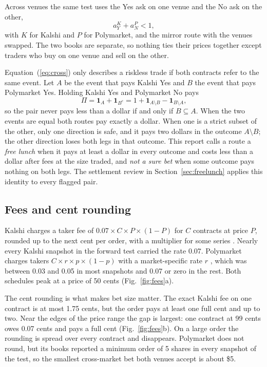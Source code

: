\documentclass[5p,letterpaper]{elsarticle}
\newcommand{\ind}{\mathbf{1}}
\begin{document}
Across venues the same test uses the Yes ask on one venue and the No ask on the other,
\begin{equation}\label{eq:cross}
a_Y^K + a_N^P < 1 ,
\end{equation}
with $K$ for Kalshi and $P$ for Polymarket, and the mirror route with the venues swapped. The two books are separate, so nothing ties their prices together except traders who buy on one venue and sell on the other.

Equation~(\ref{eq:cross}) only describes a riskless trade if both contracts refer to the same event. Let $A$ be the event that pays Kalshi Yes and $B$ the event that pays Polymarket Yes. Holding Kalshi Yes and Polymarket No pays
\begin{equation}\label{eq:payoff}
\Pi = \ind_A + \ind_{B^c} = 1 + \ind_{A\setminus B} - \ind_{B\setminus A},
\end{equation}
so the pair never pays less than a dollar if and only if $B \subseteq A$. When the two events are equal both routes pay exactly a dollar. When one is a strict subset of the other, only one direction is safe, and it pays two dollars in the outcome $A \setminus B$; the other direction loses both legs in that outcome. This report calls a route a \emph{free lunch} when it pays at least a dollar in every outcome and costs less than a dollar after fees at the size traded, and \emph{not a sure bet} when some outcome pays nothing on both legs. The settlement review in Section~\ref{sec:freelunch} applies this identity to every flagged pair.

\subsection{Fees and cent rounding}\label{sec:fees}

Kalshi charges a taker fee of $0.07 \times C \times P \times (1-P)$ for $C$ contracts at price $P$, rounded up to the next cent per order, with a multiplier for some series \cite{kalshifees}. Nearly every Kalshi snapshot in the forward test carried the rate 0.07. Polymarket charges takers $C \times r \times p \times (1-p)$ with a market-specific rate $r$ \cite{polyfees}, which was between 0.03 and 0.05 in most snapshots and 0.07 or zero in the rest. Both schedules peak at a price of 50 cents (Fig.~\ref{fig:fees}a).

The cent rounding is what makes bet size matter. The exact Kalshi fee on one contract is at most 1.75 cents, but the order pays at least one full cent and up to two. Near the edges of the price range the gap is largest: one contract at 99 cents owes 0.07 cents and pays a full cent (Fig.~\ref{fig:fees}b). On a large order the rounding is spread over every contract and disappears. Polymarket does not round, but its books reported a minimum order of 5 shares in every snapshot of the test, so the smallest cross-market bet both venues accept is about \$5.
\end{document}
